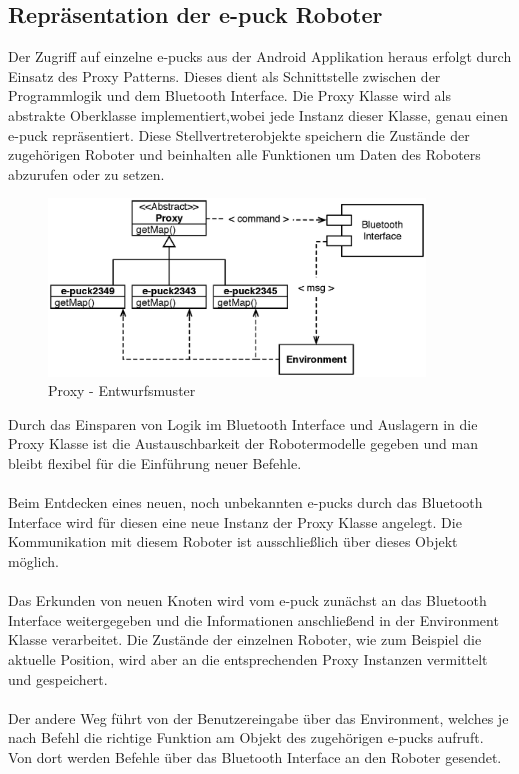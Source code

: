 \documentclass[10pt,a4paper]{article}
\begin{document}
			\subsection{Repräsentation der e-puck Roboter}
  			Der Zugriff auf einzelne e-pucks aus der Android Applikation heraus erfolgt durch Einsatz des Proxy Patterns. Dieses dient als Schnittstelle
  			zwischen der Programmlogik und dem Bluetooth Interface. Die Proxy Klasse wird als abstrakte Oberklasse implementiert,wobei jede Instanz
  			dieser Klasse, genau einen e-puck repräsentiert. Diese Stellvertreterobjekte speichern die Zustände der zugehörigen Roboter und beinhalten
  			alle Funktionen um Daten des Roboters abzurufen oder zu setzen.
			\begin{figure}[h]
				\centering
				\includegraphics[width=10cm]{images/android_proxy.eps}
  				\caption{Proxy - Entwurfsmuster}
  			\end{figure}	
  			Durch das Einsparen von Logik im Bluetooth Interface und Auslagern in die Proxy Klasse ist die Austauschbarkeit der Robotermodelle gegeben
  			und man bleibt flexibel für die Einführung neuer Befehle. \\ \\
  			Beim Entdecken eines neuen, noch unbekannten e-pucks durch das Bluetooth Interface wird für diesen eine neue Instanz der Proxy Klasse
  			angelegt. Die Kommunikation mit diesem Roboter ist ausschließlich über dieses Objekt möglich.\\ \\
  			Das Erkunden von neuen Knoten wird vom e-puck zunächst an das Bluetooth Interface weitergegeben und die Informationen anschließend
  			in der Environment Klasse verarbeitet. Die Zustände der einzelnen Roboter, wie zum Beispiel die aktuelle Position, wird aber an die
  			entsprechenden Proxy Instanzen vermittelt und gespeichert.\\ \\
  			Der andere Weg führt von der Benutzereingabe über das Environment, welches je nach Befehl die richtige Funktion am Objekt des zugehörigen
  			e-pucks aufruft. Von dort werden Befehle über das Bluetooth Interface an den Roboter gesendet.
\end{document}
